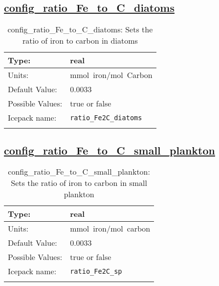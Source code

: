 \subsection[config\_ratio\_Fe\_to\_C\_diatoms]{\hyperref[sec:nm_tab_biogeochemistry]{config\_ratio\_Fe\_to\_C\_diatoms}}
\label{subsec:nm_sec_config_ratio_Fe_to_C_diatoms}
\begin{center}
\begin{longtable}{| p{2.0in} || p{4.0in} |}
    \hline
    Type: & real \\
    \hline
    Units: & \si{mmol.iron/mol.Carbon} \\
    \hline
    Default Value: & 0.0033 \\
    \hline
    Possible Values: & true or false \\
    \hline
    Icepack name: & \verb+ratio_Fe2C_diatoms+ \\
    \hline
    \caption{config\_ratio\_Fe\_to\_C\_diatoms: Sets the ratio of iron to carbon in diatoms}
\end{longtable}
\end{center}
\subsection[config\_ratio\_Fe\_to\_C\_small\_plankton]{\hyperref[sec:nm_tab_biogeochemistry]{config\_ratio\_Fe\_to\_C\_small\_plankton}}
\label{subsec:nm_sec_config_ratio_Fe_to_C_small_plankton}
\begin{center}
\begin{longtable}{| p{2.0in} || p{4.0in} |}
    \hline
    Type: & real \\
    \hline
    Units: & \si{mmol.iron/mol.carbon} \\
    \hline
    Default Value: & 0.0033 \\
    \hline
    Possible Values: & true or false \\
    \hline
    Icepack name: & \verb+ratio_Fe2C_sp+ \\
    \hline
    \caption{config\_ratio\_Fe\_to\_C\_small\_plankton: Sets the ratio of iron to carbon in small plankton}
\end{longtable}
\end{center}
